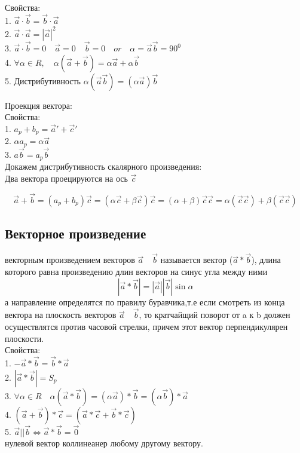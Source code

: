 \documentclass[a4paper, 12pt]{article}
\begin{document}
Свойства:\\
1. $ \vec{a} \cdot \vec{b} = \vec{b} \cdot \vec{a} $\\
2. $ \vec{a} \cdot \vec{a} = |\vec{a}|^2 $\\
3. $ \vec{a} \cdot \vec{b} = 0 \quad \vec{a} = 0 \quad \vec{b} = 0 \quad or \quad \alpha = \vec{a}  \vec{b} = 90^0 $ \\
4. $ \forall \alpha \in R, \quad \alpha(\vec{a}+ \vec{b}) = \alpha \vec{a} + \alpha \vec{b}$\\
5. Дистрибутивность $ \alpha(\vec{a}\vec{b}) = (\alpha \vec{a}) \vec{b}$

Проекция вектора:\\
Свойства:\\
1. $ a_p + b_p = \vec{a}' + \vec{c}' $\\
2. $ \alpha a_p = \alpha \vec{a} $\\
3. $ a \vec{b} = a_p \vec{b} $\\

\newpage
Докажем дистрибутивность скалярного произведения:\\
Два вектора проецируются на ось $ \vec{c} $
\begin{mdframed}[backgroundcolor=blue!20] 
\[
	\vec{a} + \vec{b} = (a_p + b_p)\vec{c}=(\alpha \vec{c} + \beta \vec{c})\vec{c} = (\alpha + \beta)\vec{c}\vec{c} = \alpha(\vec{c}\vec{c})+ \beta(\vec{c}\vec{c})	
\]
\end{mdframed}

\subsection{Векторное произведение}
векторным произведением векторов $ \vec{a} \quad \vec{b} $ называется вектор ($ \vec{a}*\vec{b} $), длина которого равна произведению длин векторов на синус угла между ними \[  |\vec{a}* \vec{b}|=|\vec{a}||\vec{b}| \sin \alpha \] а направление определятся по правилу буравчика,т.е если смотреть из конца вектора на плоскость векторов $ \vec{a} \quad \vec{b} $, то кратчайщий поворот от a к b должен осуществлятся против часовой стрелки, причем этот вектор перпендикулярен плоскости.\\

Свойства:\\
1. $ -\vec{a}*\vec{b} = \vec{b}*\vec{a} $\\
2. $  |\vec{a}*\vec{b}| = S_p$\\
3. $  \forall \alpha \in R \quad \alpha(\vec{a}*\vec{b})=(\alpha \vec{a}) * \vec{b}=(\alpha \vec{b}) * \vec{a}$\\
4. $  (\vec{a} + \vec{b})*\vec{c} = (\vec{a}*\vec{c} + \vec{b}*\vec{c})$\\
5. $  \vec{a} || \vec{b} \Leftrightarrow \vec{a}*\vec{b} = \vec{0} $\\
нулевой вектор коллинеанер любому другому вектору.\\
\end{document}
